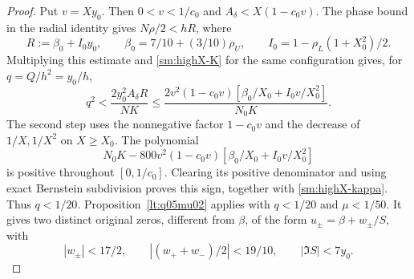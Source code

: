 \begin{proof}
Put $v=Xy_0$. Then $0<v<1/c_0$ and
$A_\delta<X(1-c_0v)$.
The phase bound in the radial identity gives
$N\rho/2<hR$, where
\[
 R:=\beta_0+I_0y_0,\qquad
 \beta_0=7/10+(3/10)\rho_U,\qquad
 I_0=1-\rho_L(1+X_0^2)/2.
\]
Multiplying this estimate and \eqref{sm:highX-K} for the same
configuration gives, for $q=Q/h^2=y_0/h$,
\begin{equation}\label{sm:highX-joint}
 q^2<\frac{2y_0^2A_\delta R}{NK}
 \le\frac{2v^2(1-c_0v)
            [\beta_0/X_0+I_0v/X_0^2]}{N_0K}.
\end{equation}
The second step uses the nonnegative factor $1-c_0v$ and
the decrease of $1/X,1/X^2$ on $X\ge X_0$.
The polynomial
\begin{equation}\label{sm:highX-q-polynomial}
 N_0K-800v^2(1-c_0v)
             [\beta_0/X_0+I_0v/X_0^2]
\end{equation}
is positive throughout $[0,1/c_0]$.
Clearing its positive denominator and using exact Bernstein
subdivision proves this sign, together with
\eqref{sm:highX-kappa}. Thus $q<1/20$.
Proposition~\ref{lt:q05mu02} applies with $q<1/20$ and $\mu<1/50$.
It gives two distinct original zeros, different
from $\beta$, of the form $u_\pm=\beta+w_\pm/S$, with
\begin{equation}\label{sm:highX-pair}
 |w_\pm|<17/2,\qquad
 |(w_++w_-)/2|<19/10,\qquad |\Im S|<7y_0.
\end{equation}


\end{proof}
